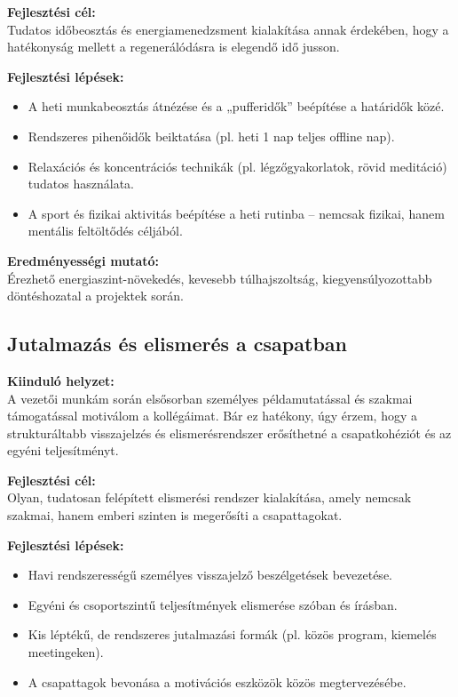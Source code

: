 \textbf{Fejlesztési cél:} \\
Tudatos időbeosztás és energiamenedzsment kialakítása annak érdekében, hogy a hatékonyság mellett 
a regenerálódásra is elegendő idő jusson.

\textbf{Fejlesztési lépések:}
\begin{itemize}
    \item A heti munkabeosztás átnézése és a „pufferidők” beépítése a határidők közé.
    \item Rendszeres pihenőidők beiktatása (pl. heti 1 nap teljes offline nap).
    \item Relaxációs és koncentrációs technikák (pl. légzőgyakorlatok, rövid meditáció) tudatos használata.
    \item A sport és fizikai aktivitás beépítése a heti rutinba – nemcsak fizikai, hanem mentális feltöltődés céljából.
\end{itemize}

\textbf{Eredményességi mutató:} \\
Érezhető energiaszint-növekedés, kevesebb túlhajszoltság, kiegyensúlyozottabb döntéshozatal a projektek során.

\subsection{Jutalmazás és elismerés a csapatban}

\textbf{Kiinduló helyzet:} \\
A vezetői munkám során elsősorban személyes példamutatással és szakmai támogatással motiválom a kollégáimat.
Bár ez hatékony, úgy érzem, hogy a strukturáltabb visszajelzés és elismerésrendszer erősíthetné 
a csapatkohéziót és az egyéni teljesítményt.

\textbf{Fejlesztési cél:} \\
Olyan, tudatosan felépített elismerési rendszer kialakítása, amely nemcsak szakmai, hanem emberi 
szinten is megerősíti a csapattagokat.

\textbf{Fejlesztési lépések:}
\begin{itemize}
    \item Havi rendszerességű személyes visszajelző beszélgetések bevezetése.
    \item Egyéni és csoportszintű teljesítmények elismerése szóban és írásban.
    \item Kis léptékű, de rendszeres jutalmazási formák (pl. közös program, kiemelés meetingeken).
    \item A csapattagok bevonása a motivációs eszközök közös megtervezésébe.
\end{itemize}

